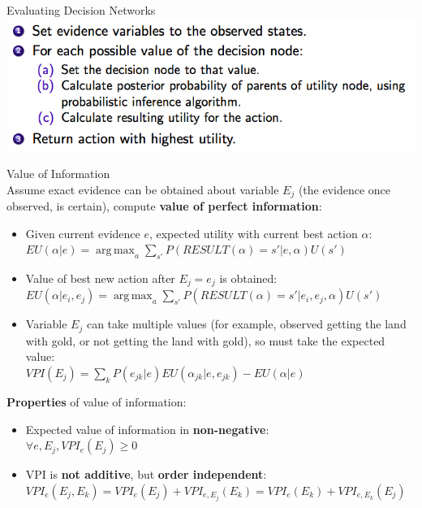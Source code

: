 \documentclass[12pt]{article}
\begin{document}
\begin{tcolorbox}
Evaluating Decision Networks\\

\includegraphics[scale=0.5]{p24}
\end{tcolorbox}


\noindent
{\large{Value of Information}}\\
Assume exact evidence can be obtained about variable $E_j$ (the evidence once observed, is certain), compute \textbf{value of perfect information}:
\begin{itemize}
\item  Given current evidence $e$, expected utility with current best action $\alpha$:\\
$EU(\alpha | e) =  \operatorname{arg\,max}_a \sum_{s'}^{} P(RESULT(\alpha) = s' | e, \alpha) U(s')$
\item Value of best new action after $E_j = e_j$ is obtained:\\
$EU(\alpha | e_i, e_j) = \operatorname{arg\,max}_a \sum_{s'}^{} P(RESULT(\alpha) = s' | e_i, e_j,  \alpha) U(s') $
\item Variable $E_j$ can take multiple values (for example, observed getting the land with gold, or not getting the land with gold), so must take the expected value:\\
$VPI(E_j) = \sum_{k}^{} P(e_{jk} | e) EU(\alpha_{jk} | e, e_{jk}) - EU(\alpha | e)$

\end{itemize}

\noindent
\textbf{Properties} of value of information: 
\begin{itemize}
\item Expected value of information in \textbf{non-negative}:\\
$\forall e, E_j, VPI_e(E_j) \geq 0$ 

\item VPI is \textbf{not additive}, but \textbf{order independent}:\\
 $VPI_e(E_j, E_k) = VPI_e(E_j) + VPI_{e, E_j}(E_k ) = VPI_e(E_k) + VPI_{e, E_k}(E_j )$
\end{itemize}
\end{document}
